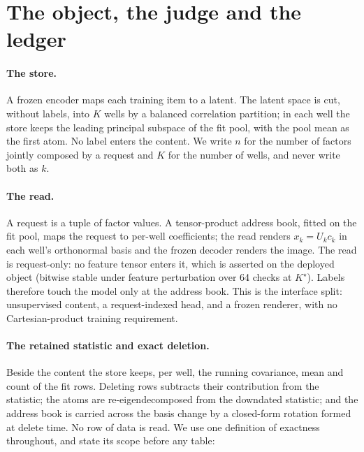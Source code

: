 \documentclass{article} %
\newcommand{\Kstar}{\ensuremath{K^{\star}}}
\begin{document}
\section{The object, the judge and the ledger}
\label{sec:object}

\paragraph{The store.} A frozen encoder maps each training item to a latent. The latent
space is cut, without labels, into $K$ wells by a balanced correlation partition; in each well
the store keeps the leading principal subspace of the fit pool, with the pool mean as the
first atom. No label enters the content. We write $n$ for the number of factors jointly
composed by a request and $K$ for the number of wells, and never write both as $k$.

\paragraph{The read.} A request is a tuple of factor values. A tensor-product address book,
fitted on the fit pool, maps the request to per-well coefficients; the read renders
$x_k=U_k c_k$ in each well's orthonormal basis and the frozen decoder renders the image. The
read is request-only: no feature tensor enters it, which is asserted on the deployed object
(bitwise stable under feature perturbation over 64 checks at $\Kstar$).
Labels therefore touch the model only at the address book. This is the interface split:
unsupervised content, a request-indexed head, and a frozen renderer, with no Cartesian-product
training requirement.

\paragraph{The retained statistic and exact deletion.} Beside the content the store keeps, per
well, the running covariance, mean and count of the fit rows. Deleting rows subtracts their
contribution from the statistic; the atoms are re-eigendecomposed from the downdated
statistic; and the address book is carried across the basis change by a closed-form rotation
formed at delete time. No row of data is read. We use one definition of exactness throughout,
and state its scope before any table:
\end{document}
